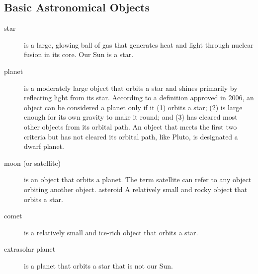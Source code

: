 \subsection{Basic Astronomical Objects}
\begin{description}
\item[star] is a large, glowing ball of gas that generates heat and light through nuclear fusion in its core. Our Sun is a star.
\item[planet] is a moderately large object that orbits a star and shines primarily by reflecting light from its star. According to a definition
approved in 2006, an object can be considered a planet only if it (1) orbits a star; (2) is large enough for its own gravity to make
it round; and (3) has cleared most other objects from its orbital path. An object that meets the first two criteria but has not
cleared its orbital path, like Pluto, is designated a dwarf planet.
\item[moon (or satellite)] is an object that orbits a planet. The term satellite can refer to any object orbiting another object.
asteroid A relatively small and rocky object that orbits a star.
\item[comet] is a relatively small and ice-rich object that orbits a star.
\item[extrasolar planet] is a planet that orbits a star that is not our Sun.
\end{description}

